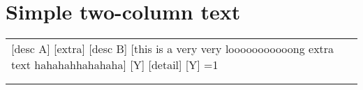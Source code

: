 \documentclass{article}
\makeatletter
\gdef\bidGroupFillSpec{GroupBGOne}
\gdef\bidGroupFillSpecLeft{GroupBGOneLeft}
\newlength{\bidLeftWidth}\setlength{\bidLeftWidth}{.66\linewidth}
\newlength{\bidRightWidth}\setlength{\bidRightWidth}{.66\linewidth}
\newcommand{\BidRowStretch}{0.5}
\newcounter{bidNeed}
\gdef\bidLabel{}\gdef\bidDesc{}
\gdef\bidLabel{#1}\setcounter{bidNeed}{1}%
\newenvironment{bidsemi}{%
  \begingroup
  \par\ttfamily\parskip=0pt\parindent=0pt%
  \setcounter{bidNeed}{0}\gdef\bidLabel{}\gdef\bidDesc{}%
  \renewcommand{\arraystretch}{\BidRowStretch}%
  \begin{tabular}{@{}p{\bidLeftWidth}@{\hspace{0.0em}}p{\bidRightWidth}@{}}%
}{%
  \ifnum\value{bidNeed}=1\relax
    \ifx\bidDesc\empty
      {\cellcolor{\bidGroupFillSpecLeft}{\color{bidLabelColor}\texttt{\bfseries \bidLabel}}} & {\cellcolor{\bidGroupFillSpec}}\\
    \else
      {\cellcolor{\bidGroupFillSpecLeft}{\color{bidLabelColor}\texttt{\bfseries \bidLabel :}}{\texttt{\color{bidDescColor} \bidDesc}}} & {\cellcolor{\bidGroupFillSpec}}\\
    \fi
  \fi
  \end{tabular}\par\endgroup%
}
\makeatother
\begin{document}
\section*{Simple two-column text}
\begin{bidsemi}
\bid{A}[desc A]
\subbid{A1}
\subbid{A2}[extra]
\subbid{A3}
\bid{B}[desc B]
\subbid{B1}[this is a very very looooooooooong extra text hahahahhahahaha]
\subsubbid{X}[Y]
\subbid{B2}
\bid{C}
\subbid{C1}
\subbid{C2}[detail]
\subsubbid{X}[Y]
\bid{D}
\flushbid
\bid{E}
\subbid{E1}
\end{bidsemi}
\end{document}
